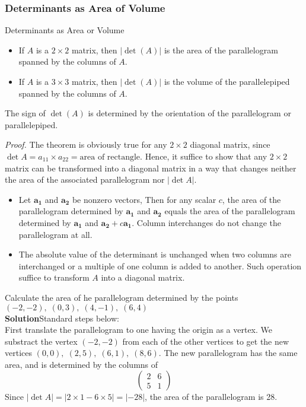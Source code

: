 \documentclass[10pt, a4paper]{article}
\begin{document}
\subsubsection*{Determinants as Area of Volume}
\begin{proposition}Determinants as Area or Volume\\
    \begin{itemize} 
        \item If $A$ is a $2\times 2$ matrix, then $|\det(A)|$ is the area of the parallelogram spanned by the columns of $A$.
        \item If $A$ is a $3\times 3$ matrix, then $|\det(A)|$ is the volume of the parallelepiped spanned by the columns of $A$.
    \end{itemize}
    The sign of $\det(A)$ is determined by the orientation of the parallelogram or parallelepiped.
\end{proposition}
\indent\textit{Proof.} The theorem is obviously true for any $2\times 2$ diagonal matrix, since $\det A = a_{11}\times a_{22} = {\text{area of rectangle}}$. Hence, it suffice to show that any $2\times 2$ matrix can be transformed into a diagonal matrix in a way that changes neither the area of the associated parallelogram nor $|\det A|$.
\begin{itemize}
    \item Let $\mathbf{a_1}$ and $\mathbf{a_2}$ be nonzero vectors, Then for any scalar $c$, the area of the parallelogram determined by $\mathbf{a_1}$ and $\mathbf{a_2}$ equals the area of the parallelogram determined by $\mathbf{a_1}$ and $\mathbf{a_2}+c\mathbf{a_1}$. Column interchanges do not change the parallelogram at all. 
    \item The absolute value of the determinant is unchanged when two columns are interchanged or a multiple of one column is added to another. Such operation suffice to transform $A$ into a diagonal matrix.
\end{itemize}
\begin{example}
    \;\;\;\;\;  Calculate the area of he parallelogram determined by the points $(-2,-2),\;(0,3),\;(4,-1),\;(6,4)$\\
    \textbf{Solution}\;\;Standard steps below:\\
    First translate the parallelogram to one having the origin as a vertex. We substract the vertex $(-2,-2)$ from each of the other vertices to get the new vertices $(0,0),\;(2,5),\;(6,1),\;(8,6)$. The new parallelogram has the same area, and is determined by the columns of $$
    \begin{pmatrix}
        2 & 6 \\
        5 & 1
    \end{pmatrix}
    $$
    Since $|\det A|=|2\times 1 - 6\times 5| = |-28|$, the area of the parallelogram is 28.
\end{example}
\end{document}

